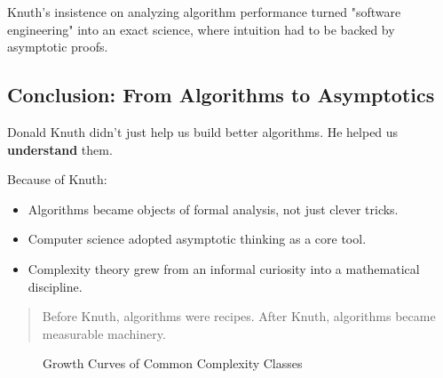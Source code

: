 Knuth’s insistence on analyzing algorithm performance turned "software engineering" into an exact science, where intuition had to be backed by asymptotic proofs.

\subsection{Conclusion: From Algorithms to Asymptotics}

Donald Knuth didn’t just help us build better algorithms.  
He helped us \textbf{understand} them.

Because of Knuth:

\begin{itemize}
    \item Algorithms became objects of formal analysis, not just clever tricks.
    \item Computer science adopted asymptotic thinking as a core tool.
    \item Complexity theory grew from an informal curiosity into a mathematical discipline.
\end{itemize}

\begin{quote}
Before Knuth, algorithms were recipes. After Knuth, algorithms became measurable machinery.
\end{quote}


\begin{figure}[H]
    \centering
    \caption{Growth Curves of Common Complexity Classes}
    \label{fig:complexity-curves}
\end{figure}
    